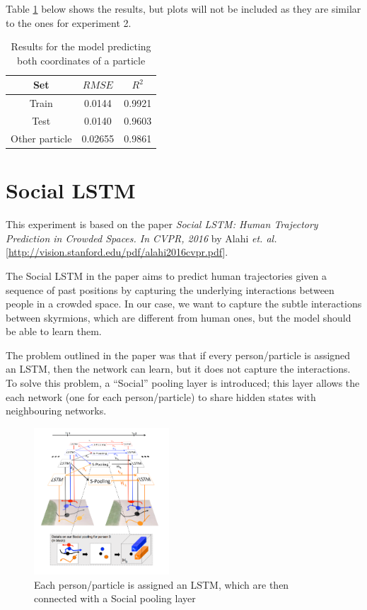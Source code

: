 \documentclass[a4paper]{article}
\begin{document}
  Table \ref{table:rnn4} below shows the results, but plots will not be included as they are similar to the ones for experiment 2.

  \begin{table}[h!]
    \centering
    \begin{tabular}{|c | c c|} 
     \hline
     Set & $RMSE$ & $R^2$ \\ [0.5ex] 
     \hline\hline
     Train & 0.0144 & 0.9921 \\ 
     Test & 0.0140 & 0.9603 \\
     Other particle & 0.02655 & 0.9861 \\
     \hline
    \end{tabular}
    \caption{Results for the model predicting both coordinates of a particle}
    \label{table:rnn4}
  \end{table}

  \section{Social LSTM}
  This experiment is based on the paper \textit{Social LSTM: Human Trajectory Prediction in Crowded Spaces. In CVPR, 2016} by Alahi \textit{et. al.} [\url{http://vision.stanford.edu/pdf/alahi2016cvpr.pdf}].

  The Social LSTM in the paper aims to predict human trajectories given a sequence of past positions by capturing the underlying interactions between people in a crowded space. In our case, we want to capture the subtle interactions between skyrmions, which are different from human ones, but the model should be able to learn them.

  The problem outlined in the paper was that if every person/particle is assigned an LSTM, then the network can learn, but it does not capture the interactions. To solve this problem, a ``Social'' pooling layer is introduced; this layer allows the each network (one for each person/particle) to share hidden states with neighbouring networks.

  \begin{figure}[h]
    \centering
    \includegraphics[width=0.45\textwidth]{social_lstm.png}
    \caption{Each person/particle is assigned an LSTM, which are then connected with a Social pooling layer}
    \label{fig:social_lstm}
  \end{figure}
\end{document}
